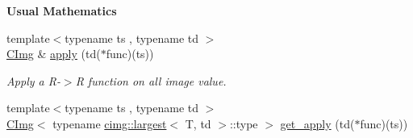\begin{Indent}{\bf Usual Mathematics}\par
{\em \label{_amgrpe0a3c3d326bb872c0f8b2b038bea2668}
 }\begin{DoxyCompactItemize}
\item 
\hypertarget{structcimg__library_1_1_c_img_a553c00244788179a44e48609e1d24129}{
{\footnotesize template$<$typename ts , typename td $>$ }\\\hyperlink{structcimg__library_1_1_c_img}{CImg} \& \hyperlink{structcimg__library_1_1_c_img_a553c00244788179a44e48609e1d24129}{apply} (td($\ast$func)(ts))}
\label{structcimg__library_1_1_c_img_a553c00244788179a44e48609e1d24129}

\begin{DoxyCompactList}\small\item\em Apply a R-\/$>$R function on all image value. \item\end{DoxyCompactList}\item 
\hypertarget{structcimg__library_1_1_c_img_a9c1eba2852aa02dbd5ab1827722dd16d}{
{\footnotesize template$<$typename ts , typename td $>$ }\\\hyperlink{structcimg__library_1_1_c_img}{CImg}$<$ typename \hyperlink{structcimg__library_1_1cimg_1_1largest}{cimg::largest}$<$ T, td $>$::type $>$ \hyperlink{structcimg__library_1_1_c_img_a9c1eba2852aa02dbd5ab1827722dd16d}{get\_\-apply} (td($\ast$func)(ts))}
\label{structcimg__library_1_1_c_img_a9c1eba2852aa02dbd5ab1827722dd16d}


\end{DoxyCompactItemize}
\end{Indent}
